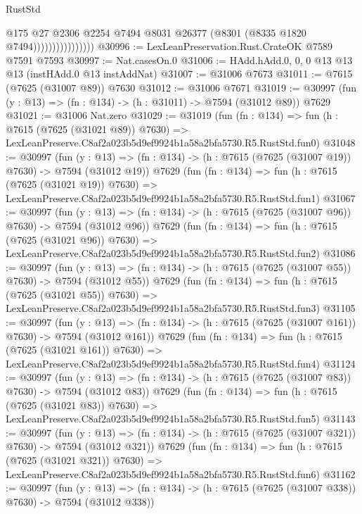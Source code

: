 \begin{lexlean}{RustStd}
\begin{coremodule}
                                @175
                                @27
                                @2306
                                @2254
                                @7494
                                @8031
                                @26377
                                (@8301 (@8335 @1820 @7494))))))))))))))))
@30996 := LexLeanPreservation.Rust.CrateOK @7589 @7591 @7593
@30997 := Nat.casesOn.{0}
@31006 := HAdd.hAdd.{0, 0, 0} @13 @13 @13 (instHAdd.{0} @13 instAddNat)
@31007 := @31006 @7673
@31011 := @7615 (@7625 (@31007 @89)) @7630
@31012 := @31006 @7671
@31019 := @30997 (fun (y : @13) => (fn : @134) -> (h : @31011) -> @7594 (@31012 @89)) @7629
@31021 := @31006 Nat.zero
@31029 := @31019
    (fun (fn : @134) =>
    fun (h : @7615 (@7625 (@31021 @89)) @7630) =>
    LexLeanPreserve.C8af2a023b5d9ef9924b1a58a2bfa5730.R5.RustStd.fun0)
@31048 := @30997
    (fun (y : @13) => (fn : @134) -> (h : @7615 (@7625 (@31007 @19)) @7630) -> @7594 (@31012 @19))
    @7629
    (fun (fn : @134) =>
    fun (h : @7615 (@7625 (@31021 @19)) @7630) =>
    LexLeanPreserve.C8af2a023b5d9ef9924b1a58a2bfa5730.R5.RustStd.fun1)
@31067 := @30997
    (fun (y : @13) => (fn : @134) -> (h : @7615 (@7625 (@31007 @96)) @7630) -> @7594 (@31012 @96))
    @7629
    (fun (fn : @134) =>
    fun (h : @7615 (@7625 (@31021 @96)) @7630) =>
    LexLeanPreserve.C8af2a023b5d9ef9924b1a58a2bfa5730.R5.RustStd.fun2)
@31086 := @30997
    (fun (y : @13) => (fn : @134) -> (h : @7615 (@7625 (@31007 @55)) @7630) -> @7594 (@31012 @55))
    @7629
    (fun (fn : @134) =>
    fun (h : @7615 (@7625 (@31021 @55)) @7630) =>
    LexLeanPreserve.C8af2a023b5d9ef9924b1a58a2bfa5730.R5.RustStd.fun3)
@31105 := @30997
    (fun (y : @13) => (fn : @134) -> (h : @7615 (@7625 (@31007 @161)) @7630) -> @7594 (@31012 @161))
    @7629
    (fun (fn : @134) =>
    fun (h : @7615 (@7625 (@31021 @161)) @7630) =>
    LexLeanPreserve.C8af2a023b5d9ef9924b1a58a2bfa5730.R5.RustStd.fun4)
@31124 := @30997
    (fun (y : @13) => (fn : @134) -> (h : @7615 (@7625 (@31007 @83)) @7630) -> @7594 (@31012 @83))
    @7629
    (fun (fn : @134) =>
    fun (h : @7615 (@7625 (@31021 @83)) @7630) =>
    LexLeanPreserve.C8af2a023b5d9ef9924b1a58a2bfa5730.R5.RustStd.fun5)
@31143 := @30997
    (fun (y : @13) => (fn : @134) -> (h : @7615 (@7625 (@31007 @321)) @7630) -> @7594 (@31012 @321))
    @7629
    (fun (fn : @134) =>
    fun (h : @7615 (@7625 (@31021 @321)) @7630) =>
    LexLeanPreserve.C8af2a023b5d9ef9924b1a58a2bfa5730.R5.RustStd.fun6)
@31162 := @30997
    (fun (y : @13) => (fn : @134) -> (h : @7615 (@7625 (@31007 @338)) @7630) -> @7594 (@31012 @338))

\end{coremodule}
\end{lexlean}
